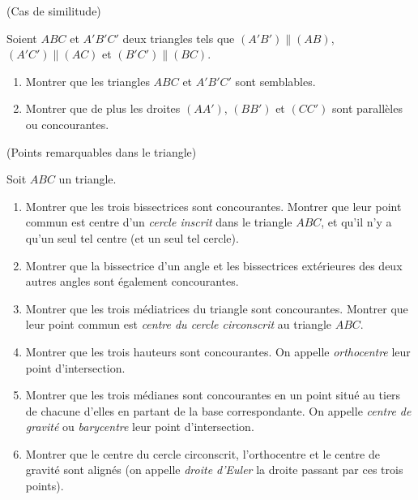 \documentclass[a4paper,11pt,reqno]{amsart}
\begin{document}
\begin{exo} (Cas de similitude)

  Soient $ABC$ et $A'B'C'$ deux triangles tels que $(A'B') \parallel (AB)$, $(A'C') \parallel (AC)$ et $(B'C') \parallel (BC)$.
  \begin{enumerate}
    \item Montrer que les triangles $ABC$ et $A'B'C'$ sont semblables.
    \item Montrer que de plus les droites $(AA')$, $(BB')$ et $(CC')$ sont parallèles ou concourantes.
  \end{enumerate}

\end{exo}


\begin{exo} (Points remarquables dans le triangle)

  Soit $ABC$ un triangle.
  \begin{enumerate}
    \item Montrer que les trois bissectrices sont concourantes. Montrer que leur point commun est centre d'un \emph{cercle inscrit} dans le triangle $ABC$, et qu'il n'y a qu'un seul tel centre (et un seul tel cercle).
    \item Montrer que la bissectrice d'un angle et les bissectrices extérieures des deux autres angles sont également concourantes.
    \item Montrer que les trois médiatrices du triangle sont concourantes. Montrer que leur point commun est \emph{centre du cercle circonscrit} au triangle $ABC$.
    \item Montrer que les trois hauteurs sont concourantes. On appelle \emph{orthocentre} leur point d'intersection.
    \item Montrer que les trois médianes sont concourantes en un point situé au tiers de chacune d'elles en partant de la base correspondante. On appelle \emph{centre de gravité} ou \emph{barycentre} leur point d'intersection.
    \item Montrer que le centre du cercle circonscrit, l'orthocentre et le centre de gravité sont alignés (on appelle \emph{droite d'Euler} la droite passant par ces trois points). %
  \end{enumerate}
\end{exo}
\end{document}
